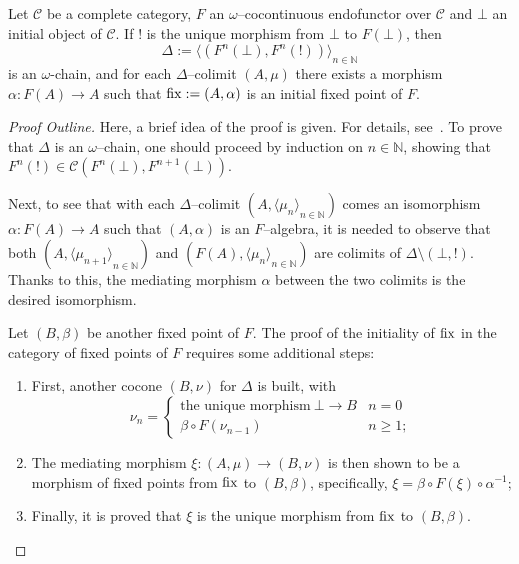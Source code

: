 \begin{thm}
  Let \(\mathcal{C}\) be a complete category, \(F\) an \(\omega{}\)--cocontinuous endofunctor over \(\mathcal{C}\) and \(\bot{}\) an initial object of \(\mathcal{C}\). If \(!{}\) is the unique morphism from \(\bot{}\) to \(F(\bot{})\), then
  \begin{equation}
    \Delta := {\langle(F^n(\bot),F^n(!))\rangle}_{n \in \mathbb{N}}
  \end{equation}
  is an \(\omega{}\)-chain, and for each \(\Delta\)--colimit \((A,\mu)\) there exists a morphism \(\alpha \colon F(A) \to A\) such that \(\operatorname{fix} := (A,\alpha)\) is an initial fixed point of \(F\).
\end{thm}
\begin{proof}[Proof Outline]
  Here, a brief idea of the proof is given. For details, see~\cite{Hemerik1988}.
  To prove that \(\Delta{}\) is an \(\omega{}\)--chain, one should proceed by induction on \(n \in \mathbb{N}\), showing that \(F^n(!) \in \mathcal{C}(F^n(\bot),F^{n+1}(\bot))\).

  Next, to see that with each \(\Delta\)--colimit \((A,{\langle\mu_n \rangle}_{n\in\mathbb{N}})\) comes an isomorphism \(\alpha \colon F(A) \to A\) such that \((A,\alpha)\) is an \(F\)--algebra, it is needed to observe that both \((A,{\langle \mu_{n+1} \rangle}_{n\in\mathbb{N}})\) and \((F(A),{\langle\mu_n \rangle}_{n\in\mathbb{N}})\) are colimits of \(\Delta \setminus (\bot,!)\).
  Thanks to this, the mediating morphism \(\alpha{}\) between the two colimits is the desired isomorphism.

  Let \((B,\beta)\) be another fixed point of \(F\). The proof of the initiality of \(\operatorname{fix}\) in the category of fixed points of \(F\) requires some additional steps:
  \begin{enumerate}
    \item First, another cocone \((B,\nu)\) for \(\Delta{}\) is built, with
    \begin{equation*}
      \nu_n =
      \begin{cases}
        \text{the unique morphism}\: \bot \to B & n = 0 \\
        \beta \circ F(\nu_{n-1}) & n \ge 1;
      \end{cases}
    \end{equation*}
    \item The mediating morphism \(\xi \colon (A,\mu) \to (B, \nu)\) is then shown to be a morphism of fixed points from \(\operatorname{fix}\) to \((B,\beta)\), specifically, \(\xi = \beta \circ F(\xi) \circ \alpha^{-1}\);
    \item Finally, it is proved that \(\xi{}\) is the unique morphism from \(\operatorname{fix}\) to \((B,\beta)\).
  \end{enumerate}
\end{proof}
